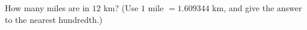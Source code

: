 How many miles are in $12$ km? (Use $1$ mile $=1.609344$ km, and give the answer to the nearest hundredth.)
